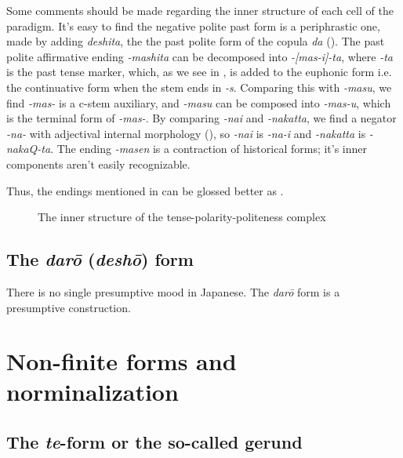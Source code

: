 \documentclass[UTF8, a4paper, oneside, scheme=plain]{ctexrep}
\newcommand{\corpus}[1]{\emph{#1}}
\begin{document}
Some comments should be made regarding the inner structure of each cell of the paradigm.
It's easy to find the negative polite past form is a periphrastic one,
made by adding \corpus{deshita}, the the past polite form of the copula \corpus{da} 
().
The past polite affirmative ending \corpus{-mashita} can be decomposed into 
\corpus{-[mas-i]-ta},
where \corpus{-ta} is the past tense marker,
which, as we see in ,
is added to the euphonic form i.e. the continuative form when the stem ends in \corpus{-s}.
Comparing this with \corpus{-masu},
we find \corpus{-mas-} is a c-stem auxiliary,
and \corpus{-masu} can be composed into \corpus{-mas-u},
which is the terminal form of \corpus{-mas-}.
By comparing \corpus{-nai} and \corpus{-nakatta},
we find a negator \corpus{-na-} with adjectival internal morphology (),
so \corpus{-nai} is \corpus{-na-i} and \corpus{-nakatta} is \corpus{-nakaQ-ta}.
The ending \corpus{-masen} is a contraction of historical forms;
it's inner components aren't easily recognizable.

Thus, the endings mentioned in  can be glossed better as 
.

\begin{figure}[H]
    \centering
    
    \caption{The inner structure of the tense-polarity-politeness complex}
    \label{fig:analyzing-tpp-complex}
\end{figure}

\subsection{The \corpus{dar\={o}} (\corpus{desh\={o}}) form}\label{sec:daro-form}

There is no single presumptive mood in Japanese.
The \corpus{dar\={o}} form is a presumptive construction.

\section{Non-finite forms and norminalization}\label{sec:non-finite}

\subsection{The \corpus{te}-form or the so-called gerund}\label{sec:te-form}
\end{document}

